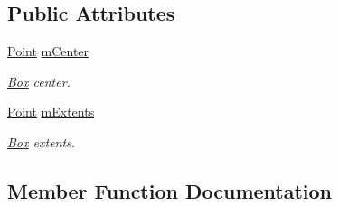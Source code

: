 \subsection*{Public Attributes}
\begin{DoxyCompactItemize}
\item 
\hyperlink{classOpcode_1_1Point}{Point} \hyperlink{classOpcode_1_1CollisionAABB_a8f0fddd36eed66548871a508bde34711}{m\+Center}\hypertarget{classOpcode_1_1CollisionAABB_a8f0fddd36eed66548871a508bde34711}{}\label{classOpcode_1_1CollisionAABB_a8f0fddd36eed66548871a508bde34711}

\begin{DoxyCompactList}\small\item\em \hyperlink{classBox}{Box} center. \end{DoxyCompactList}\item 
\hyperlink{classOpcode_1_1Point}{Point} \hyperlink{classOpcode_1_1CollisionAABB_a10128d5b2224d3eac9d7c51e415c7a56}{m\+Extents}\hypertarget{classOpcode_1_1CollisionAABB_a10128d5b2224d3eac9d7c51e415c7a56}{}\label{classOpcode_1_1CollisionAABB_a10128d5b2224d3eac9d7c51e415c7a56}

\begin{DoxyCompactList}\small\item\em \hyperlink{classBox}{Box} extents. \end{DoxyCompactList}\end{DoxyCompactItemize}


\subsection{Member Function Documentation}
